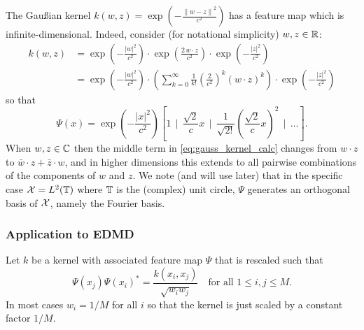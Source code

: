 \begin{example}
    The Gaußian kernel 
    $k(w, z) = \exp \left( -\frac{\left\| w - z \right\|^2}{c^2} \right)$ has a feature 
    map which is infinite-dimensional. Indeed, consider (for notational simplicity) 
    $w, z \in \mathbb{R}$: 
    \begin{equation}
        \label{eq:gauss_kernel_calc}
        \begin{split}
            k(w, z) &= 
            \exp \left( -\frac{| w |^2}{c^2} \right) \cdot
            \exp \left( \frac{2\, w \cdot z}{c^2} \right) \cdot
            \exp \left( -\frac{| z |^2}{c^2} \right) \\
            &= \exp \left( -\frac{| w |^2}{c^2} \right) \cdot
            \left( \sum_{k=0}^{\infty} \frac{1}{k!} \left( \frac{2}{c^2} \right)^k (w \cdot z)^k \right)
            \cdot \exp \left( -\frac{| z |^2}{c^2} \right)
        \end{split}
    \end{equation}
    so that 
    \begin{equation}
        \Psi (x) = 
        \exp \left( -\frac{| x |^2}{c^2} \right)
        \left[ 
            1 \ \ \Bigg|\ \ 
            \frac{\sqrt{2}}{c} x \ \ \Bigg|\ \ 
            \frac{1}{\sqrt{2 !}} \left( \frac{\sqrt{2}}{c} x \right)^2 \ \ \Bigg|\ \ 
            \ldots 
        \right] . 
    \end{equation}
    When $w, z \in \mathbb{C}$ then the middle term in \ref{eq:gauss_kernel_calc} changes from 
    $w \cdot z$ to $\bar{w} \cdot z + \bar{z} \cdot w$, and in higher dimensions this 
    extends to all pairwise combinations of the components of $w$ and $z$. We note 
    (and will use later) that in the specific case $\mathcal{X} = L^2 (\mathbb{T})$ where $\mathbb{T}$ is 
    the (complex) unit circle, $\Psi$ generates an orthogonal basis of $\mathcal{X}$, namely 
    the Fourier basis. 
\end{example}


\subsubsection{Application to EDMD}

Let $k$ be a kernel with associated feature map $\Psi$ that is rescaled such that 
\begin{equation}
    \Psi (x_j) \Psi (x_i)^* = \frac{k(x_i, x_j)}{\sqrt{w_i w_j}} \quad 
    \text{for all } 1 \leq i, j \leq M . 
\end{equation} 
In most cases $w_i = 1/M$ for all $i$ so that the kernel is just scaled by a constant 
factor $1/M$. 

